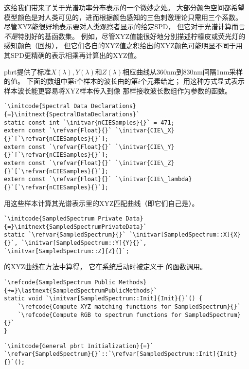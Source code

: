 这给我们带来了关于光谱功率分布表示的一个微妙之处。
大部分颜色空间都希望模型颜色是对人类可见的，进而根据颜色感知的三色刺激理论只需用三个系数。
尽管XYZ能很好地表示要对人类观察者显示的给定SPD，
但它对于光谱计算而言{\itshape 不是}特别好的基函数集。
例如，尽管XYZ值能很好地分别描述柠檬皮或荧光灯的感知颜色（回想），
但它们各自的XYZ值之积给出的XYZ颜色可能明显不同于用其SPD更精确的表示相乘再计算出的XYZ值。

pbrt提供了标准$X(\lambda),Y(\lambda)$和$Z(\lambda)$相应曲线从360nm到830nm间隔1nm采样的值。
下面的数组中第$i$个样本的波长由的第$i$个元素给定；
用这种方式显式表示样本波长能更容易将XYZ样本传入到像
那样接收波长数组作为参数的函数。
\begin{lstlisting}
`\initcode{Spectral Data Declarations}{=}\initnext{SpectralDataDeclarations}`
static const int `\initvar{nCIESamples}{}` = 471;
extern const `\refvar{Float}{}` `\initvar{CIE\_X}{}`[`\refvar{nCIESamples}{}`];
extern const `\refvar{Float}{}` `\initvar{CIE\_Y}{}`[`\refvar{nCIESamples}{}`];
extern const `\refvar{Float}{}` `\initvar{CIE\_Z}{}`[`\refvar{nCIESamples}{}`];
extern const `\refvar{Float}{}` `\initvar{CIE\_lambda}{}`[`\refvar{nCIESamples}{}`];
\end{lstlisting}

用这些样本计算其光谱表示里的XYZ匹配曲线（即它们自己是）。
\begin{lstlisting}
`\initcode{SampledSpectrum Private Data}{=}\initnext{SampledSpectrumPrivateData}`
static `\refvar{SampledSpectrum}{}` `\initvar[SampledSpectrum::X]{X}{}`, `\initvar[SampledSpectrum::Y]{Y}{}`, `\initvar[SampledSpectrum::Z]{Z}{}`;
\end{lstlisting}

的XYZ曲线在方法中算得，
它在系统启动时被定义于
的函数调用。
\begin{lstlisting}
`\refcode{SampledSpectrum Public Methods}{+=}\lastnext{SampledSpectrumPublicMethods}`
static void `\initvar[SampledSpectrum::Init]{Init}{}`() {
    `\refcode{Compute XYZ matching functions for SampledSpectrum}{}`
    `\refcode{Compute RGB to spectrum functions for SampledSpectrum}{}`
}
\end{lstlisting}
\begin{lstlisting}
`\initcode{General pbrt Initialization}{=}`
`\refvar{SampledSpectrum}{}`::`\refvar[SampledSpectrum::Init]{Init}{}`();
\end{lstlisting}

